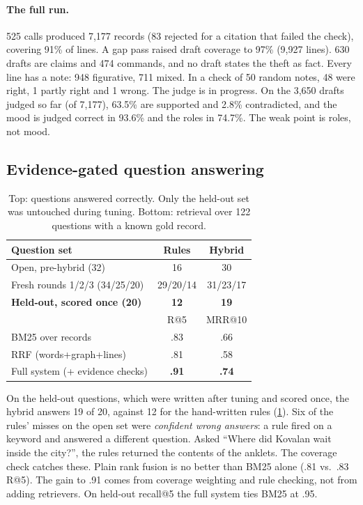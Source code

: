 \documentclass[11pt]{article}
\begin{document}
\paragraph{The full run.} 525 calls produced 7,177 records (83 rejected for a citation that failed the check), covering 91\% of lines. A gap pass raised draft coverage to 97\% (9,927 lines). 630 drafts are claims and 474 commands, and no draft states the theft as fact. Every line has a note: 948 figurative, 711 mixed. In a check of 50 random notes, 48 were right, 1 partly right and 1 wrong. The judge is in progress. On the 3,650 drafts judged so far (of 7,177), 63.5\% are supported and 2.8\% contradicted, and the mood is judged correct in 93.6\% and the roles in 74.7\%. The weak point is roles, not mood.

\subsection{Evidence-gated question answering}
\label{sec:qa}

\begin{table}[t]
\centering\small
\setlength{\tabcolsep}{4pt}
\begin{tabular}{@{}lcc@{}}
\toprule
Question set & Rules & Hybrid \\
\midrule
Open, pre-hybrid (32) & 16 & 30 \\
Fresh rounds 1/2/3 (34/25/20) & 29/20/14 & 31/23/17 \\
\textbf{Held-out, scored once (20)} & \textbf{12} & \textbf{19} \\
\midrule
 & R@5 & MRR@10 \\
\midrule
BM25 over records & .83 & .66 \\
RRF (words+graph+lines) & .81 & .58 \\
Full system (+ evidence checks) & \textbf{.91} & \textbf{.74} \\
\bottomrule
\end{tabular}
\caption{Top: questions answered correctly. Only the held-out set was untouched during tuning. Bottom: retrieval over 122 questions with a known gold record.}
\label{tab:qa}
\end{table}

On the held-out questions, which were written after tuning and scored once, the hybrid answers 19 of 20, against 12 for the hand-written rules (\cref{tab:qa}). Six of the rules' misses on the open set were \emph{confident wrong answers}: a rule fired on a keyword and answered a different question. Asked ``Where did Kovalan wait inside the city?'', the rules returned the contents of the anklets. The coverage check catches these. Plain rank fusion is no better than BM25 alone (.81 vs.\ .83 R@5). The gain to .91 comes from coverage weighting and rule checking, not from adding retrievers. On held-out recall@5 the full system ties BM25 at .95.
\end{document}
